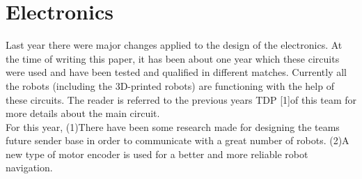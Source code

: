 \section{Electronics}
\setlength\intextsep{0pt}
Last year there were major changes applied to the design of the electronics. At the time of writing this paper, it has been about one year which these circuits were used and have been tested and qualified in different matches. Currently all the robots (including the 3D-printed robots) are functioning with the help of these circuits. The reader is referred to the previous years TDP [1]of this team for more details about the main circuit.\\
For this year, (1)There have been some research made for designing the teams future sender base in order to communicate with a great number of robots. (2)A new type of motor encoder is used for a better and more reliable robot navigation.

